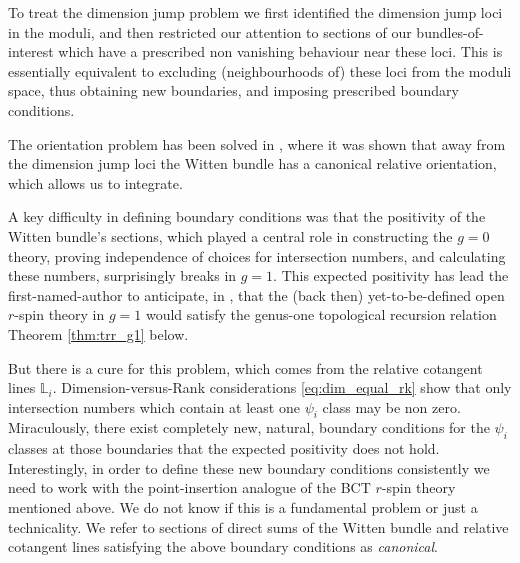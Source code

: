 \documentclass[11pt]{amsart}
\theoremstyle{definition}
\theoremstyle{remark}
\newcommand{\CL}{{\mathbb{L}}}
\newcommand{\<}{\left<}
\renewcommand{\>}{\right>}
\numberwithin{equation}{section}
\begin{document}
To treat the dimension jump problem we first identified the dimension jump loci in the moduli, and then restricted our attention to sections of our bundles-of-interest which have a prescribed non vanishing behaviour near these loci.
This is essentially equivalent to excluding (neighbourhoods of) these loci from the moduli space, thus obtaining new boundaries, and imposing prescribed boundary conditions.
 
The orientation problem has been solved in \cite[\S 3]{TZ1}, where it was shown that away from the dimension jump loci the Witten bundle has a canonical relative orientation, which allows us to integrate.

A key difficulty in defining boundary conditions was that the positivity of the Witten bundle's sections, which played a central role in constructing the $g=0$ theory, proving independence of choices for intersection numbers, and calculating these numbers, surprisingly breaks in $g=1.$
This expected positivity has lead the first-named-author to anticipate, in \cite{BCT3}, that the (back then) yet-to-be-defined open $r$-spin theory in $g=1$ would satisfy the genus-one topological recursion relation Theorem \ref{thm:trr_g1} below.

But there is a cure for this problem, which comes from the relative cotangent lines $\CL_i.$ Dimension-versus-Rank considerations \eqref{eq:dim_equal_rk} show that only intersection numbers which contain at least one $\psi_i$ class may be non zero. Miraculously, there exist completely new, natural, boundary conditions for the $\psi_i$ classes at those boundaries that the expected positivity does not hold. Interestingly, in order to define these new boundary conditions consistently we need to work with the point-insertion analogue of the BCT $r$-spin theory mentioned above. We do not know if this is a fundamental problem or just a technicality. We refer to sections of direct sums of the Witten bundle and relative cotangent lines satisfying the above boundary conditions as \emph{canonical}.
\end{document}
